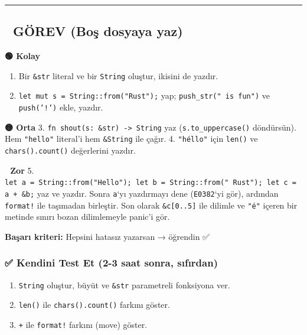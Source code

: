 \documentclass[12pt,a4paper]{article}
\begin{document}
\begin{center}\rule{0.5\linewidth}{0.5pt}\end{center}

\subsection{📝 GÖREV (Boş dosyaya yaz)}\label{görev-boş-dosyaya-yaz-4}

\textbf{🟢 Kolay}

\begin{enumerate}
\def\labelenumi{\arabic{enumi}.}
\tightlist
\item
  Bir \texttt{\&str} literal ve bir \texttt{String} oluştur, ikisini de yazdır.
\item
  \texttt{let\ mut\ s\ =\ String::from("Rust");} yap; \texttt{push\_str("\ is\ fun")} ve \texttt{push('!')} ekle, yazdır.
\end{enumerate}

\textbf{🟡 Orta}
3. \texttt{fn\ shout(s:\ \&str)\ -\textgreater{}\ String} yaz (\texttt{s.to\_uppercase()} döndürsün). Hem \texttt{"hello"} literal'i hem \texttt{\&String} ile çağır.
4. \texttt{"héllo"} için \texttt{len()} ve \texttt{chars().count()} değerlerini yazdır.

\textbf{🔴 Zor}
5. \texttt{let\ a\ =\ String::from("Hello");\ let\ b\ =\ String::from("\ Rust");\ let\ c\ =\ a\ +\ \&b;} yaz ve yazdır. Sonra \texttt{a}`yı yazdırmayı dene (\texttt{E0382}`yi gör), ardından \texttt{format!} ile taşımadan birleştir. Son olarak \texttt{\&c{[}0..5{]}} ile dilimle ve \texttt{"é"} içeren bir metinde sınırı bozan dilimlemeyle panic'i gör.

\textbf{Başarı kriteri:} Hepsini hatasız yazarsan → öğrendin ✅

\subsubsection{✅ Kendini Test Et (2-3 saat sonra, sıfırdan)}\label{kendini-test-et-2-3-saat-sonra-sıfırdan-5}

\begin{enumerate}
\def\labelenumi{\arabic{enumi}.}
\tightlist
\item
  \texttt{String} oluştur, büyüt ve \texttt{\&str} parametreli fonksiyona ver.
\item
  \texttt{len()} ile \texttt{chars().count()} farkını göster.
\item
  \texttt{+} ile \texttt{format!} farkını (move) göster.
\end{enumerate}
\end{document}
